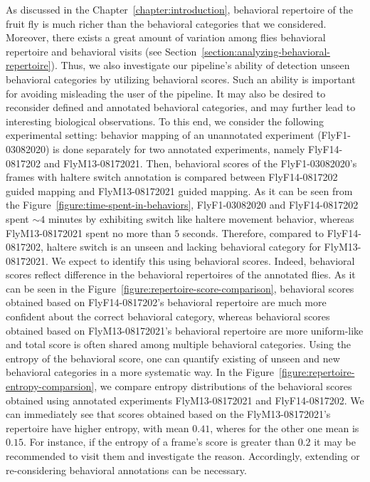 As discussed in the Chapter~\ref{chapter:introduction}, behavioral repertoire of the fruit fly is much richer than the behavioral categories that we considered.
Moreover, there exists a great amount of variation among flies behavioral repertoire and behavioral visits (see Section~\ref{section:analyzing-behavioral-repertoire}).
Thus, we also investigate our pipeline's ability of detection unseen behavioral categories by utilizing behavioral scores.
Such an ability is important for avoiding misleading the user of the pipeline. It may also be desired to reconsider defined and annotated behavioral categories, and may further lead to interesting biological observations.
To this end, we consider the following experimental setting: behavior mapping of an unannotated experiment (FlyF1-03082020) is done separately for two annotated experiments, namely FlyF14-0817202 and FlyM13-08172021.
Then, behavioral scores of the FlyF1-03082020's frames with haltere switch annotation is compared between FlyF14-0817202 guided mapping and FlyM13-08172021 guided mapping.
As it can be seen from the Figure~\ref{figure:time-spent-in-behaviors}, FlyF1-03082020 and FlyF14-0817202 spent ${\sim}4$ minutes by exhibiting switch like haltere movement behavior, whereas FlyM13-08172021 spent no more than $5$ seconds.
Therefore, compared to FlyF14-0817202, haltere switch is an unseen and lacking behavioral category for FlyM13-08172021.
We expect to identify this using behavioral scores.
Indeed, behavioral scores reflect difference in the behavioral repertoires of the annotated flies.
As it can be seen in the Figure~\ref{figure:repertoire-score-comparison}, behavioral scores obtained based on FlyF14-0817202's behavioral repertoire are much more confident about the correct behavioral category, whereas behavioral scores obtained based on FlyM13-08172021's behavioral repertoire are more uniform-like and total score is often shared among multiple behavioral categories.
Using the entropy of the behavioral score, one can quantify existing of unseen and new behavioral categories in a more systematic way.
In the Figure~\ref{figure:repertoire-entropy-comparsion}, we compare entropy distributions of the behavioral scores obtained using annotated experiments FlyM13-08172021 and FlyF14-0817202.
We can immediately see that scores obtained based on the FlyM13-08172021's repertoire have higher entropy, with mean $0.41$, wheres for the other one mean is $0.15$.
For instance, if the entropy of a frame's score is greater than $0.2$ it may be recommended to visit them and investigate the reason.
Accordingly, extending or re-considering behavioral annotations can be necessary.



